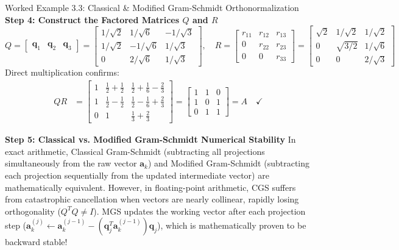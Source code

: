 \begin{examplebox}{Worked Example 3.3: Classical \& Modified Gram-Schmidt Orthonormalization}
\textbf{Step 4: Construct the Factored Matrices $Q$ and $R$}
\begin{equation*}
Q = \begin{bmatrix} \mathbf{q}_1 & \mathbf{q}_2 & \mathbf{q}_3 \end{bmatrix} = \begin{bmatrix}
1/\sqrt{2} & 1/\sqrt{6} & -1/\sqrt{3} \\
1/\sqrt{2} & -1/\sqrt{6} & 1/\sqrt{3} \\
0 & 2/\sqrt{6} & 1/\sqrt{3}
\end{bmatrix}, \quad
R = \begin{bmatrix}
r_{11} & r_{12} & r_{13} \\
0 & r_{22} & r_{23} \\
0 & 0 & r_{33}
\end{bmatrix} = \begin{bmatrix}
\sqrt{2} & 1/\sqrt{2} & 1/\sqrt{2} \\
0 & \sqrt{3/2} & 1/\sqrt{6} \\
0 & 0 & 2/\sqrt{3}
\end{bmatrix}
\end{equation*}
Direct multiplication confirms:
\begin{align*}
QR &= \begin{bmatrix}
1 & \frac{1}{2} + \frac{1}{2} & \frac{1}{2} + \frac{1}{6} - \frac{2}{3} \\[4pt]
1 & \frac{1}{2} - \frac{1}{2} & \frac{1}{2} - \frac{1}{6} + \frac{2}{3} \\[4pt]
0 & 1 & \frac{1}{3} + \frac{2}{3}
\end{bmatrix} = \begin{bmatrix} 1 & 1 & 0 \\ 1 & 0 & 1 \\ 0 & 1 & 1 \end{bmatrix} = A \quad \checkmark
\end{align*}

\textbf{Step 5: Classical vs. Modified Gram-Schmidt Numerical Stability}
In exact arithmetic, Classical Gram-Schmidt (subtracting all projections simultaneously from the raw vector $\mathbf{a}_k$) and Modified Gram-Schmidt (subtracting each projection sequentially from the updated intermediate vector) are mathematically equivalent. 
However, in floating-point arithmetic, CGS suffers from catastrophic cancellation when vectors are nearly collinear, rapidly losing orthogonality ($Q^T Q \ne I$). MGS updates the working vector after each projection step ($\mathbf{a}_k^{(j)} \leftarrow \mathbf{a}_k^{(j-1)} - (\mathbf{q}_j^T \mathbf{a}_k^{(j-1)})\mathbf{q}_j$), which is mathematically proven to be backward stable!
\end{examplebox}

